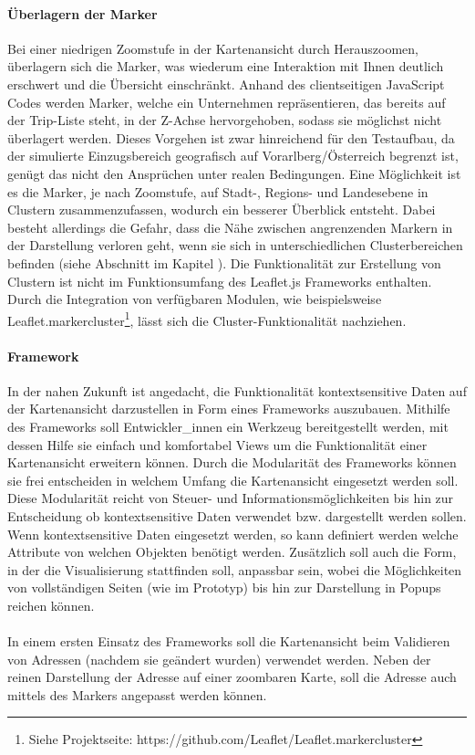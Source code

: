 \documentclass[Bachelorarbeit.tex]{subfiles}
\begin{document}
\paragraph{Überlagern der Marker}
Bei einer niedrigen Zoomstufe in der Kartenansicht durch Herauszoomen, überlagern sich die Marker, was wiederum eine Interaktion mit Ihnen deutlich erschwert und die Übersicht einschränkt.
Anhand des clientseitigen JavaScript Codes werden Marker, welche ein Unternehmen repräsentieren, das bereits auf der Trip-Liste steht, in der Z-Achse hervorgehoben, sodass sie möglichst nicht überlagert werden.
Dieses Vorgehen ist zwar hinreichend für den Testaufbau, da der simulierte Einzugsbereich geografisch auf Vorarlberg/Österreich begrenzt ist, genügt das nicht den Ansprüchen unter realen Bedingungen.
Eine Möglichkeit ist es die Marker, je nach Zoomstufe, auf Stadt-, Regions- und Landesebene in Clustern zusammenzufassen, wodurch ein besserer Überblick entsteht.
Dabei besteht allerdings die Gefahr, dass die Nähe zwischen angrenzenden Markern in der Darstellung verloren geht, wenn sie sich in unterschiedlichen Clusterbereichen befinden (siehe Abschnitt  im Kapitel ).
Die Funktionalität zur Erstellung von Clustern ist nicht im Funktionsumfang des Leaflet.js Frameworks enthalten.
Durch die Integration von verfügbaren Modulen, wie beispielsweise Leaflet.markercluster\footnote{Siehe Projektseite: https://github.com/Leaflet/Leaflet.markercluster}, lässt sich die Cluster-Funktionalität nachziehen.

\paragraph{Framework}
In der nahen Zukunft ist angedacht, die Funktionalität kontextsensitive Daten auf der Kartenansicht darzustellen in Form eines Frameworks auszubauen.
Mithilfe des Frameworks soll Entwickler\_innen ein Werkzeug bereitgestellt werden, mit dessen Hilfe sie einfach und komfortabel Views um die Funktionalität einer Kartenansicht erweitern können.
Durch die Modularität des Frameworks können sie frei entscheiden in welchem Umfang die Kartenansicht eingesetzt werden soll.
Diese Modularität reicht von Steuer- und Informationsmöglichkeiten bis hin zur Entscheidung ob kontextsensitive Daten verwendet bzw. dargestellt werden sollen.
Wenn kontextsensitive Daten eingesetzt werden, so kann definiert werden welche Attribute von welchen Objekten benötigt werden.
Zusätzlich soll auch die Form, in der die Visualisierung stattfinden soll, anpassbar sein, wobei die Möglichkeiten von vollständigen Seiten (wie im Prototyp) bis hin zur Darstellung in Popups reichen können.  
\\
\\
In einem ersten Einsatz des Frameworks soll die Kartenansicht beim Validieren von Adressen (nachdem sie geändert wurden) verwendet werden. 
Neben der reinen Darstellung der Adresse auf einer zoombaren Karte, soll die Adresse auch mittels des Markers angepasst werden können. 
\end{document}
